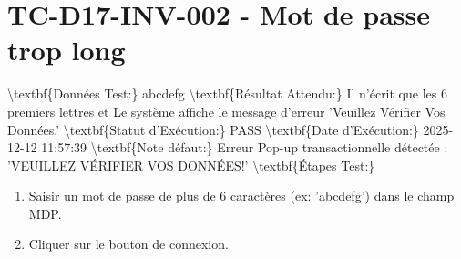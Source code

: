 \documentclass{article}%
\begin{document}
\section{TC{-}D17{-}INV{-}002 {-} Mot de passe trop long}%
\label{sec:TC{-}D17{-}INV{-}002{-}Motdepassetroplong}%
\textbackslash{}textbf\{Données Test:\} abcdefg\newline%
\newline%
%
\textbackslash{}textbf\{Résultat Attendu:\} Il n'écrit que les 6 premiers lettres et Le système affiche le message d'erreur 'Veuillez Vérifier Vos Données.'\newline%
\newline%
%
\textbackslash{}textbf\{Statut d'Exécution:\} PASS\newline%
\newline%
%
\textbackslash{}textbf\{Date d'Exécution:\} 2025{-}12{-}12 11:57:39\newline%
\newline%
%
\textbackslash{}textbf\{Note défaut:\} Erreur Pop{-}up transactionnelle détectée : 'VEUILLEZ VÉRIFIER VOS DONNÉES!'\newline%
\newline%
%
\textbackslash{}textbf\{Étapes Test:\}\newline%
%
\begin{enumerate}%
\item%
Saisir un mot de passe de plus de 6 caractères (ex: 'abcdefg') dans le champ MDP.%
\item%
Cliquer sur le bouton de connexion.%
\end{enumerate}

%
\end{document}
